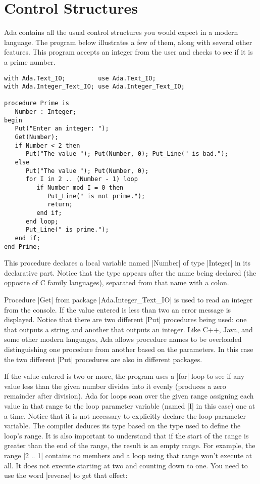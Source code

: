 \section{Control Structures}
\label{sec:control-structures}

Ada contains all the usual control structures you would expect in a modern language. The program
below illustrates a few of them, along with several other features. This program accepts an
integer from the user and checks to see if it is a prime number.

\begin{lstlisting}
with Ada.Text_IO;         use Ada.Text_IO;
with Ada.Integer_Text_IO; use Ada.Integer_Text_IO;

procedure Prime is
   Number : Integer;
begin
   Put("Enter an integer: ");
   Get(Number);
   if Number < 2 then
      Put("The value "); Put(Number, 0); Put_Line(" is bad.");
   else
      Put("The value "); Put(Number, 0);
      for I in 2 .. (Number - 1) loop
         if Number mod I = 0 then
            Put_Line(" is not prime.");
            return;
         end if;
      end loop;
      Put_Line(" is prime.");
   end if;
end Prime;
\end{lstlisting}

\noindent This procedure declares a local variable named |Number| of type |Integer| in its
declarative part. Notice that the type appears after the name being declared (the opposite of C
family languages), separated from that name with a colon.

Procedure |Get| from package |Ada.Integer_Text_IO| is used to read an integer from the console.
If the value entered is less than two an error message is displayed. Notice that there are two
different |Put| procedures being used: one that outputs a string and another that outputs an
integer. Like C++, Java, and some other modern languages, Ada allows procedure names to be
overloaded distinguishing one procedure from another based on the parameters. In this case the
two different |Put| procedures are also in different packages.

If the value entered is two or more, the program uses a |for| loop to see if any value less than
the given number divides into it evenly (produces a zero remainder after division). Ada for
loops scan over the given range assigning each value in that range to the loop parameter
variable (named |I| in this case) one at a time. Notice that it is not necessary to explicitly
declare the loop parameter variable. The compiler deduces its type based on the type used to
define the loop's range. It is also important to understand that if the start of the range is
greater than the end of the range, the result is an empty range. For example, the range |2 .. 1|
contains no members and a loop using that range won't execute at all. It does not execute
starting at two and counting down to one. You need to use the word |reverse| to get that effect:

